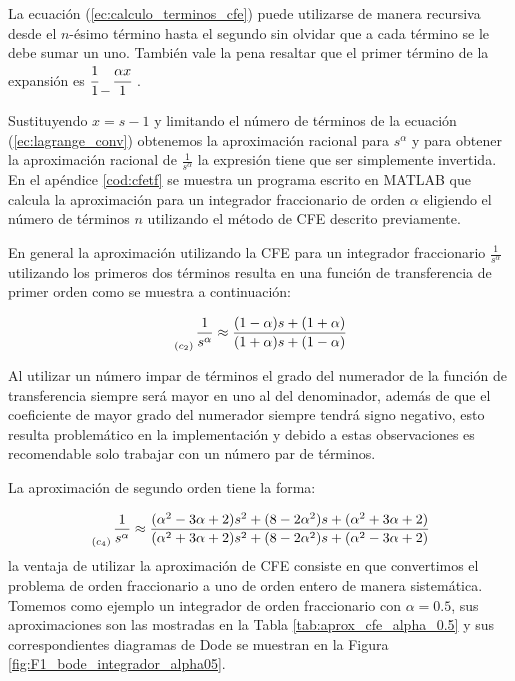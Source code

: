 	La ecuación (\ref{ec:calculo_terminos_cfe}) puede utilizarse de manera recursiva desde el $n$-ésimo término hasta el segundo sin olvidar que a cada término se le debe sumar un uno. También vale la pena resaltar que el primer término de la expansión es $\cfrac{1}{1} \genfrac{}{}{0pt}{0}{}{-} \cfrac{\alpha x}{1}$ . 

	Sustituyendo $x = s - 1$ y limitando el número de términos de la ecuación (\ref{ec:lagrange_conv}) obtenemos la aproximación racional para $s^{\alpha}$ y para obtener la aproximación racional de $\frac{1}{s^{\alpha}}$ la expresión tiene que ser simplemente invertida. En el apéndice \ref{cod:cfetf} se muestra un programa escrito en MATLAB que calcula la aproximación para un integrador fraccionario de orden $\alpha$ eligiendo el número de términos $n$ utilizando el método de CFE descrito previamente.

	En general la aproximación utilizando la CFE para un integrador fraccionario $\frac{1}{s^{\alpha}}$ utilizando los primeros dos términos resulta en una función de transferencia de primer orden como se muestra a continuación:

	\begin{equation}
		\genfrac{}{}{0pt}{0}{}{_{(c_{2})}} \frac{1}{s^{\alpha}} \approx \frac{(1 - \alpha)s + (1 + \alpha) }{(1 + \alpha)s + (1 - \alpha)} 
	\end{equation}

	Al utilizar un número impar de términos el grado del numerador de la función de transferencia siempre será mayor en uno al del denominador, además de que el coeficiente de mayor grado del numerador siempre tendrá signo negativo, esto resulta problemático en la implementación y debido a estas observaciones es recomendable solo trabajar con un número par de términos.

	La aproximación de segundo orden tiene la forma:

	\begin{equation}
		\genfrac{}{}{0pt}{0}{}{_{(c_{4})}} \frac{1}{s^{\alpha}} \approx \frac{(\alpha^{2} - 3\alpha + 2) s^{2} + (8 - 2 \alpha^{2})s + (\alpha^{2} + 3\alpha + 2) }{(\alpha^{2} + 3\alpha + 2) s^{2} + (8 - 2 \alpha^{2})s + (\alpha^{2} - 3\alpha + 2)}
	\end{equation}
	la ventaja de utilizar la aproximación de CFE consiste en que convertimos el problema de orden fraccionario a uno de orden entero de manera sistemática. Tomemos como ejemplo un integrador de orden fraccionario con $\alpha = 0.5$, sus aproximaciones son las mostradas en la Tabla \ref{tab:aprox_cfe_alpha_0.5} y sus correspondientes diagramas de Dode se muestran en la Figura \ref{fig:F1_bode_integrador_alpha05}.


